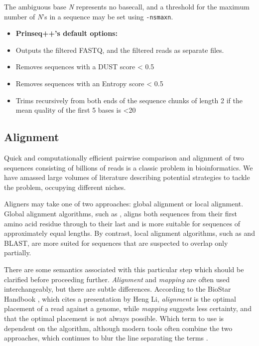 The ambiguous base \textit{N} represents no basecall, and a threshold for the maximum number of \textit{N}'s in a sequence may be set using \texttt{-ns\textunderscore max\textunderscore n}.
    
\begin{itemize}\itemsep0em
\item[]\textbf{Prinseq++'s default options:}
\item Outputs the filtered FASTQ, and the filtered reads as separate files.
\item Removes sequences with a DUST score < 0.5
\item Removes sequences with an Entropy score < 0.5 
\item Trims recursively from both ends of the sequence chunks of length 2 if the mean quality of the first 5 bases is <20 
\end{itemize}

\subsection{Alignment}

Quick and computationally efficient pairwise comparison and alignment of two sequences consisting of billions of reads is a classic problem in bioinformatics. We have amassed large volumes of literature describing potential strategies to tackle the problem, occupying different niches.

Aligners may take one of two approaches: global alignment or local alignment. Global alignment algorithms, such as \cite{needleman1970general}, aligns both sequences from their first amino acid residue through to their last and is more suitable for sequences of approximately equal lengths. By contrast, local alignment algorithms, such as \cite{smith1981identification} and BLAST, are more suited for sequences that are suspected to overlap only partially. 

There are some semantics associated with this particular step which should be clarified before proceeding further. \textit{Alignment} and \textit{mapping} are often used interchangeably, but there are subtle differences. According to the BioStar Handbook \citep{albert2020biostar}, which cites a presentation by Heng Li, \textit{alignment} is the optimal placement of a read against a genome, while \textit{mapping} suggests less certainty, and that the optimal placement is not always possible. Which term to use is dependent on the algorithm, although modern tools often combine the two approaches, which continues to blur the line separating the terms \citep{albert2020biostar}.

